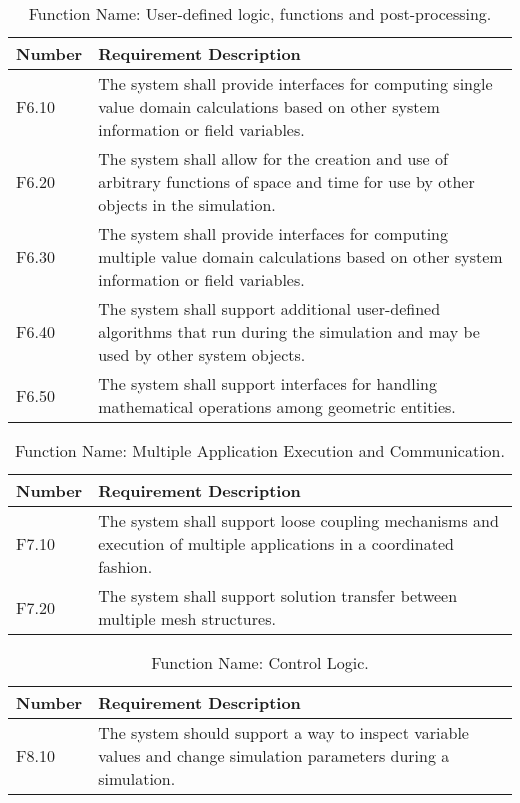 \documentclass{INLreport}
\begin{document}
\begin{table}[!htbp]
  \caption{Function Name: User-defined logic, functions and post-processing.\label{tab:pp}}
  \begin{tabular}{|l|p{12cm}|}
    \rowcolor{gray}
    Number & Requirement Description \\ \hline
    F6.10 & The system shall provide interfaces for computing single value domain calculations based on other system information or field variables. \\ \hline
    F6.20 & The system shall allow for the creation and use of arbitrary functions of space and time for use by other objects in the simulation. \\ \hline
    F6.30 & The system shall provide interfaces for computing multiple value domain calculations based on other system information or field variables. \\ \hline
    F6.40 & The system shall support additional user-defined algorithms that run during the simulation and may be used by other system objects. \\ \hline
    F6.50 & The system shall support interfaces for handling mathematical operations among geometric entities. \\ \hline
  \end{tabular}
\end{table}

\begin{table}[!htbp]
  \caption{Function Name: Multiple Application Execution and Communication.\label{tab:multiapp}}
  \begin{tabular}{|l|p{12cm}|}
    \rowcolor{gray}
    Number & Requirement Description \\ \hline
    F7.10 & The system shall support loose coupling mechanisms and execution of multiple applications in a coordinated fashion. \\ \hline
    F7.20 & The system shall support solution transfer between multiple mesh structures. \\ \hline
  \end{tabular}
\end{table}

\begin{table}[!htbp]
  \caption{Function Name: Control Logic.\label{tab:cl}}
  \begin{tabular}{|l|p{12cm}|}
    \rowcolor{gray}
    Number & Requirement Description \\ \hline
    F8.10 & The system should support a way to inspect variable values and change simulation parameters during a simulation. \\ \hline
  \end{tabular}
\end{table}
\end{document}
